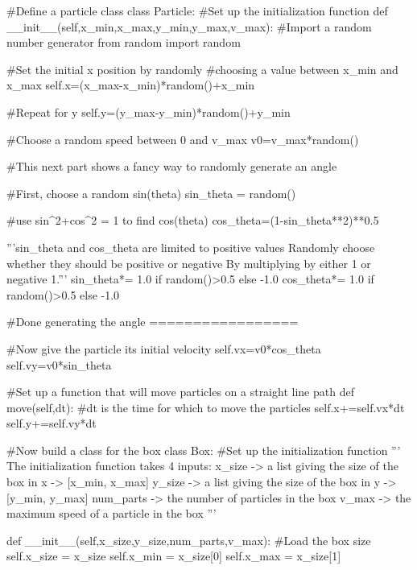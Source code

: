 \begin{codeexample}
\begin{VerbatimOut}{\listingFile}
#Define a particle class
class Particle:
    #Set up the initialization function
    def __init__(self,x_min,x_max,y_min,y_max,v_max):
        #Import a random number generator
        from random import random


        #Set the initial x position by randomly
        #choosing a value between x_min and x_max
        self.x=(x_max-x_min)*random()+x_min

        #Repeat for y
        self.y=(y_max-y_min)*random()+y_min

        #Choose a random speed between 0 and v_max
        v0=v_max*random()


        #This next part shows a fancy way to randomly generate an angle

        #First, choose a random sin(theta)
        sin_theta = random()

        #use sin^2+cos^2 = 1 to find cos(theta)
        cos_theta=(1-sin_theta**2)**0.5

        '''sin_theta and cos_theta are limited to positive values
        Randomly choose whether they should be positive or negative
        By multiplying by either 1 or negative 1.'''
        sin_theta*= 1.0 if random()>0.5 else -1.0
        cos_theta*= 1.0 if random()>0.5 else -1.0

        #Done generating the angle =================



        #Now give the particle its initial velocity
        self.vx=v0*cos_theta
        self.vy=v0*sin_theta


    #Set up a function that will move particles on a straight line path
    def move(self,dt): #dt is the time for which to move the particles
        self.x+=self.vx*dt
        self.y+=self.vy*dt



#Now build a class for the box
class Box:
    #Set up the initialization function
    '''
    The initialization function takes 4 inputs:
        x_size -> a list giving the size of the box in x -> [x_min, x_max]
        y_size -> a list giving the size of the box in y -> [y_min, y_max]
        num_parts -> the number of particles in the box
        v_max -> the maximum speed of a particle in the box '''

    def __init__(self,x_size,y_size,num_parts,v_max):
        #Load the box size
        self.x_size = x_size
        self.x_min = x_size[0]
        self.x_max = x_size[1]


\end{VerbatimOut}
\end{codeexample}
